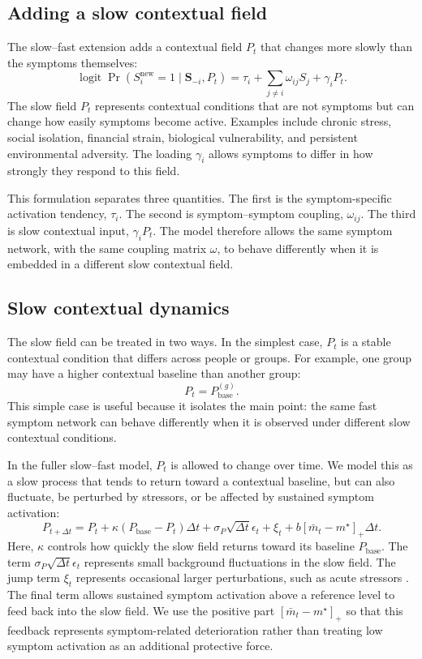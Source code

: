 \documentclass[man,12pt,floatsintext]{apa7}
\begin{document}
\subsection{Adding a slow contextual field}
The slow--fast extension adds a contextual field \(P_t\) that changes more
slowly than the symptoms themselves:
\[
\operatorname{logit}\Pr(S_i^{\mathrm{new}}=1\mid \mathbf S_{-i},P_t)
=
\tau_i+\sum_{j\neq i}\omega_{ij}S_j+\gamma_iP_t .
\]
The slow field \(P_t\) represents contextual conditions that are not symptoms
but can change how easily symptoms become active. Examples include chronic
stress, social isolation, financial strain, biological vulnerability, and
persistent environmental adversity. The loading \(\gamma_i\) allows symptoms to
differ in how strongly they respond to this field.

This formulation separates three quantities. The first is the symptom-specific
activation tendency, \(\tau_i\). The second is symptom--symptom coupling,
\(\omega_{ij}\). The third is slow contextual input, \(\gamma_iP_t\). The model
therefore allows the same symptom network, with the same coupling matrix
\(\omega\), to behave differently when it is embedded in a different slow
contextual field.

\subsection{Slow contextual dynamics}
The slow field can be treated in two ways. In the simplest case, \(P_t\) is a
stable contextual condition that differs across people or groups. For example,
one group may have a higher contextual baseline than another group:
\[
P_t = P_{\mathrm{base}}^{(g)} .
\]
This simple case is useful because it isolates the main point: the same fast
symptom network can behave differently when it is observed under different
slow contextual conditions.

In the fuller slow--fast model, \(P_t\) is allowed to change over time. We
model this as a slow process that tends to return toward a contextual baseline,
but can also fluctuate, be perturbed by stressors, or be affected by sustained
symptom activation:
\[
P_{t+\Delta t}
=
P_t
+
\kappa(P_{\mathrm{base}}-P_t)\Delta t
+
\sigma_P\sqrt{\Delta t}\epsilon_t
+
\xi_t
+
b[\bar m_t-m^\star]_+\Delta t .
\]
Here, \(\kappa\) controls how quickly the slow field returns toward its
baseline \(P_{\mathrm{base}}\). The term
\(\sigma_P\sqrt{\Delta t}\epsilon_t\) represents small background fluctuations
in the slow field. The jump term \(\xi_t\) represents occasional larger
perturbations, such as acute stressors \parencite{cohen2019ten, dohrenwend2006inventorying}. The final term allows sustained symptom
activation above a reference level to feed back into the slow field. We use the
positive part \([\bar m_t-m^\star]_+\) so that this feedback represents
symptom-related deterioration rather than treating low symptom activation as an
additional protective force.
\end{document}
